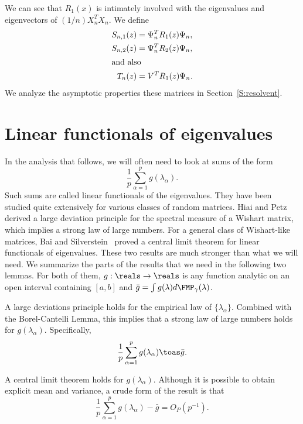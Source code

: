 We can see that $R_1(x)$ is intimately involved with the eigenvalues and
eigenvectors of $(1/n)X_n^T X_n$.  We define
\begin{align}
    S_{n,1} (z) &= \Psi_n^T R_1 (z) \Psi_n, \\
    S_{n,2} (z) &= \Psi_n^T R_2 (z) \Psi_n, \\
\intertext{and also}
    T_n (z) &= V^T R_1 (z) \Psi_n.
\end{align}
We analyze the asymptotic properties these matrices in
Section~\ref{S:resolvent}.

\section{Linear functionals of eigenvalues}

In the analysis that follows, we will often need to look at sums of the form
\[
    \frac{1}{p} \sum_{\alpha=1}^p g (\lambda_\alpha).
\]
Such sums are called linear functionals of the eigenvalues.  They have been
studied quite extensively for various classes of random matrices.  Hiai and Petz~\cite{hiai1998edw} derived a large deviation principle for the spectral measure  of a Wishart matrix, which implies a strong law of large numbers.  For a  general class of Wishart-like matrices, Bai and Silverstein~\cite{bai2004cls} proved a central limit theorem for linear functionals of eigenvalues.  These two results are much stronger than what we will need.  We summarize the parts of the results that we need in the following two lemmas. For both of them, $g: \reals \to \reals$ is any function analytic on an open interval containing $[a,b]$  and $\bar g = \int g(\lambda) d\FMP_\gamma (\lambda)$.

\begin{lemma}\label{L:wishart-lln}
    A large deviations principle holds for the empirical law of 
    $\{ \lambda_\alpha \}$.  Combined with the Borel-Cantelli Lemma, this
    implies that a strong law of large numbers holds for $g(\lambda_\alpha)$. 
    Specifically,
    \[
        \frac{1}{p} \sum_{\alpha=1}^p g( \lambda_\alpha ) \toas \bar g.
    \]
\end{lemma}
    
\begin{lemma}\label{L:wishart-clt}
    A central limit theorem holds for $g(\lambda_\alpha)$.  Although it is
    possible to obtain explicit mean and variance, a crude form of the
    result is that
    \[
        \frac{1}{p} 
        \sum_{\alpha=1}^p
            g( \lambda_\alpha ) - \bar g 
        = O_P(p^{-1}).
    \]  
\end{lemma}

